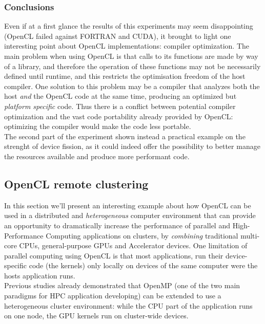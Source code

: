 \subsubsection{Conclusions}
Even if at a first glance the results of this experiments may seem disappointing (OpenCL failed against FORTRAN and CUDA),
it brought to light one interesting point about OpenCL implementations: compiler optimization.
The main problem when using OpenCL is that calls to its functions are made by way of a library, and therefore the operation of these functions may not be necessarily defined until runtime, and this restricts the optimisation freedom of the host compiler. One solution to this problem may be a compiler that analyzes both the host \emph{and} the OpenCL code at the same time, producing an optimized but \emph{platform specific} code. Thus there is a conflict between potential compiler optimization and the vast code portability already provided by OpenCL: optimizing the compiler would make the code less portable.\\
The second part of the experiment shown instead a practical example on the strenght of device fission, as it could indeed offer the possibility to better manage the resources available and produce more performant code.




\subsection{OpenCL remote clustering}
In this section we'll present an interesting example \cite{mosix:virtualcl} about how OpenCL can be used in a distributed and \emph{heterogeneous} computer environment that can provide an opportunity to dramatically increase the performance of parallel and High-Performance Computing applications on clusters, by \emph{combining} traditional multi-core CPUs, general-purpose GPUs and Accelerator devices. One limitation of parallel computing using OpenCL is that most applications, run their device-specific code (the kernels) only locally on devices of the same computer were the hosts application runs.\\
Previous studies already demonstrated \cite{barak:heterogeneous} that OpenMP (one of the two main paradigms for HPC application developing) can be extended to use a heterogeneous cluster environment: while the CPU part of the application runs on one node, the GPU kernels run on cluster-wide devices.

